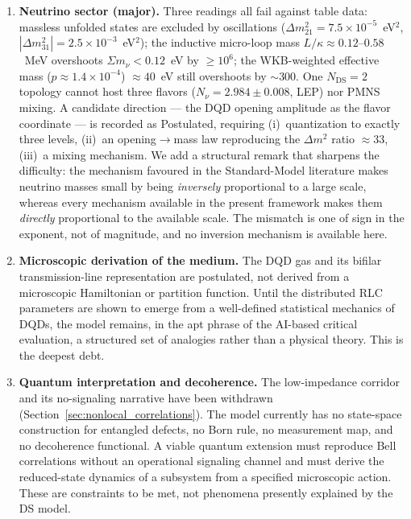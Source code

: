 \documentclass[11pt,a4paper]{article}
\theoremstyle{plain}
\theoremstyle{remark}
\newcommand{\Ncd}{\ensuremath{N_{\mathrm{DS}}}}
\begin{document}
\begin{enumerate}
    \item \textbf{Neutrino sector (major).} Three readings all fail against table data: massless unfolded states are excluded by oscillations ($\Delta m^2_{21} = 7.5\times10^{-5}$~eV$^2$, $|\Delta m^2_{31}| = 2.5\times10^{-3}$~eV$^2$); the inductive micro-loop mass $L/\kappa \approx 0.12$--$0.58$~MeV overshoots $\Sigma m_\nu < 0.12$~eV by $\ge 10^{6}$; the WKB-weighted effective mass ($p \approx 1.4\times10^{-4}$) $\approx 40$~eV still overshoots by $\sim$300. One $\Ncd=2$ topology cannot host three flavors ($N_\nu = 2.984 \pm 0.008$, LEP) nor PMNS mixing. A candidate direction --- the DQD opening amplitude as the flavor coordinate --- is recorded as Postulated, requiring (i)~quantization to exactly three levels, (ii)~an opening$\to$mass law reproducing the $\Delta m^2$ ratio $\approx 33$, (iii)~a mixing mechanism. We add a structural remark that sharpens the difficulty: the mechanism favoured in the Standard-Model literature makes neutrino masses small by being \emph{inversely} proportional to a large scale, whereas every mechanism available in the present framework makes them \emph{directly} proportional to the available scale. The mismatch is one of sign in the exponent, not of magnitude, and no inversion mechanism is available here.
    \item \textbf{Microscopic derivation of the medium.} The DQD gas and its bifilar transmission-line representation are postulated, not derived from a microscopic Hamiltonian or partition function. Until the distributed RLC parameters are shown to emerge from a well-defined statistical mechanics of DQDs, the model remains, in the apt phrase of the AI-based critical evaluation, a structured set of analogies rather than a physical theory. This is the deepest debt.
    \item \textbf{Quantum interpretation and decoherence.} The low-impedance corridor and its no-signaling narrative have been withdrawn (Section~\ref{sec:nonlocal_correlations}). The model currently has no state-space construction for entangled defects, no Born rule, no measurement map, and no decoherence functional. A viable quantum extension must reproduce Bell correlations without an operational signaling channel and must derive the reduced-state dynamics of a subsystem from a specified microscopic action. These are constraints to be met, not phenomena presently explained by the DS model.

\end{enumerate}
\end{document}
